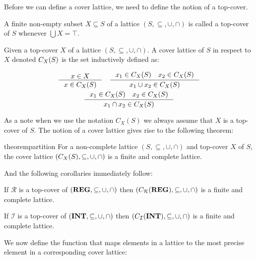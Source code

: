 Before we can define a cover lattice, we need to define the notion of a top-cover.

\begin{definition}
    A finite non-empty subset $X \subseteq S$ of a lattice $(S, \subseteq, \cup, \cap)$ is called a top-cover of $S$ whenever $\bigcup X = \top$.
\end{definition}

\begin{definition}\label{def:coverlattice}
Given a top-cover $X$ of a lattice $(S, \subseteq, \cup, \cap)$.
A cover lattice of $S$ in respect to $X$ denoted $C_{X}(S)$ is the set inductively defined as:

\begin{gather*}
    \inference{x \in X}{x \in C_X(S)} \quad
    \inference{x_1 \in C_X(S) \quad x_2 \in C_X(S)}{x_1 \cup  x_2 \in C_X(S)}\\
    \inference{x_1 \in C_X(S) \quad x_2 \in C_X(S)}{x_1 \cap  x_2 \in C_X(S)}
\end{gather*}
\end{definition}

As a note when we use the notation $C_X(S)$ we always assume that $X$ is a top-cover of $S$.
The notion of a cover lattice gives rise to the following theorem:

\begin{restatable}{theorem}{partition}\label{thm:partition}
For a non-complete lattice $(S, \subseteq, \cup, \cap)$ and top-cover $X$ of $S$, the cover lattice $(C_{X}(S), \subseteq, \cup, \cap)$ is a finite and complete lattice.
\end{restatable}

And the following corollaries immediately follow:

\begin{corollary}\label{co:topcoverr}
    If $\mathcal{R}$ is a top-cover of $(\mathbf{REG}, \subseteq, \cup, \cap)$ then $(C_{\mathcal{R}}(\mathbf{REG}), \subseteq, \cup, \cap)$ is a finite and complete lattice.
\end{corollary}

\begin{corollary}\label{co:topcoveri}
    If $\mathcal{I}$ is a top-cover of $(\mathbf{INT}, \subseteq, \cup, \cap)$ then $(C_{\mathcal{I}}(\mathbf{INT}), \subseteq, \cup, \cap)$ is a finite and complete lattice.
\end{corollary}

We now define the function that maps elements in a lattice to the most precise element in a corresponding cover lattice:

